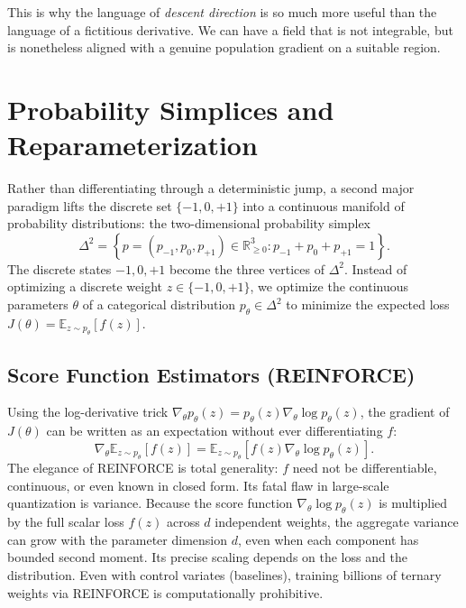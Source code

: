 This is why the language of \emph{descent direction} is so much more useful than the language of a fictitious derivative. We can have a field that is not integrable, but is nonetheless aligned with a genuine population gradient on a suitable region.

\section{Probability Simplices and Reparameterization}

Rather than differentiating through a deterministic jump, a second major paradigm lifts the discrete set $\{-1, 0, +1\}$ into a continuous manifold of probability distributions: the two-dimensional probability simplex
\begin{equation}
    \Delta^2 = \left\{ p = (p_{-1}, p_0, p_{+1}) \in \mathbb{R}_{\ge 0}^3 : p_{-1} + p_0 + p_{+1} = 1 \right\}.
\end{equation}
The discrete states $-1, 0, +1$ become the three vertices of $\Delta^2$. Instead of optimizing a discrete weight $z \in \{-1, 0, +1\}$, we optimize the continuous parameters $\theta$ of a categorical distribution $p_\theta \in \Delta^2$ to minimize the expected loss $J(\theta) = \mathbb{E}_{z \sim p_\theta}[f(z)]$.

\subsection{Score Function Estimators (REINFORCE)}

Using the log-derivative trick $\nabla_\theta p_\theta(z) = p_\theta(z) \nabla_\theta \log p_\theta(z)$, the gradient of $J(\theta)$ can be written as an expectation without ever differentiating $f$:
\begin{equation}
    \nabla_\theta \mathbb{E}_{z \sim p_\theta}[f(z)] = \mathbb{E}_{z \sim p_\theta}\!\left[ f(z) \nabla_\theta \log p_\theta(z) \right].
\end{equation}
The elegance of REINFORCE is total generality: $f$ need not be differentiable, continuous, or even known in closed form. Its fatal flaw in large-scale quantization is variance. Because the score function $\nabla_\theta \log p_\theta(z)$ is multiplied by the full scalar loss $f(z)$ across $d$ independent weights, the aggregate variance can grow with the parameter dimension $d$, even when each component has bounded second moment. Its precise scaling depends on the loss and the distribution. Even with control variates (baselines), training billions of ternary weights via REINFORCE is computationally prohibitive.

